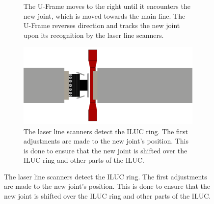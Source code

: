 \begin{figure}[H]
\begin{subfigure}{0.7\textwidth}
        \caption{The U-Frame moves to the right until it encounters the new joint, which is moved towards the main line.
            The U-Frame reverses direction and tracks the new joint upon its recognition by the laser line scanners.}
        \label{fig:oop_track}
    \end{subfigure}
    \begin{subfigure}{0.7\textwidth}
        \includegraphics[width=\textwidth ]{images/lua_oop_ILUC_ring.png}
        \caption{The laser line scanners detect the ILUC ring. The first adjustments are made to the new joint's position.
            This is done to ensure that the new joint is shifted over the ILUC ring and other parts of the ILUC.}
        \label{fig:oop_ILUC_ring}
    \end{subfigure}
\end{figure}
